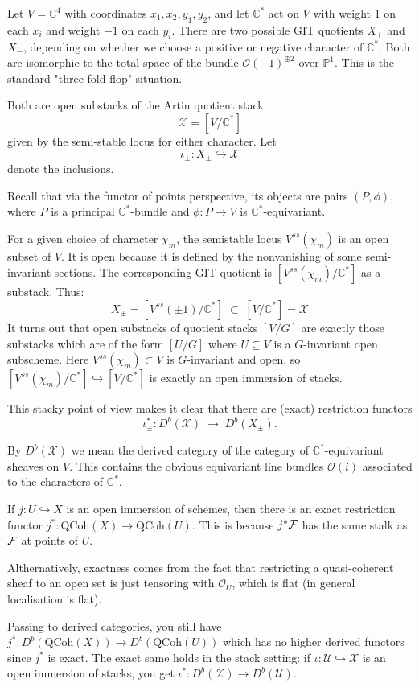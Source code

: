 \documentclass[12pt]{article}
\begin{document}
Let $V = \mathbb{C}^4$ with coordinates $x_1, x_2, y_1, y_2$, and let $\mathbb{C}^*$ act on $V$ with weight $1$ on each $x_i$ and weight $-1$ on each $y_i$. There are two possible GIT quotients $X_{+}$ and $X_{-}$, depending on whether we choose a positive or negative character of $\mathbb{C}^*$. Both are isomorphic to the total space of the bundle $\mathcal{O}(-1)^{\oplus 2}$ over $\mathbb{P}^1$. This is the standard "three-fold flop" situation.

Both are open substacks of the Artin quotient stack
\[
  \mathcal{X} = [V/\mathbb{C}^*]
\]
given by the semi-stable locus for either character.
Let
\[
  \iota_{\pm} : X_{\pm} \hookrightarrow \mathcal{X}
\]
denote the inclusions.

\begin{remark}
  Recall that via the functor of points perspective, its objects are pairs $(P,\phi)$, where $P$ is a principal $\mathbb{C}^*$-bundle and $\phi: P\to V$ is $\mathbb{C}^*$-equivariant.

  For a given choice of character $\chi_m$, the semistable locus $V^{ss}(\chi_m)$ is an open subset of $V$. It is open because it is defined by the nonvanishing of some semi-invariant sections. The corresponding GIT quotient is $[V^{ss}(\chi_m)/\mathbb{C}^*]$ as a substack.
  Thus:
  \[
    X_\pm = [V^{ss}(\pm 1)/\mathbb{C}^*] \;\subset\; [V/\mathbb{C}^*] = \mathcal{X}
  \]
  It turns out that open substacks of quotient stacks $[V/G]$ are exactly those substacks which are of the form $[U/G]$ where $U\subseteq V$ is a $G$-invariant open subscheme. Here $V^{ss}(\chi_m)\subset V$ is $G$-invariant and open, so $[V^{ss}(\chi_m)/\mathbb{C}^*]\hookrightarrow [V/\mathbb{C}^*]$ is exactly an open immersion of stacks.
\end{remark}

This stacky point of view makes it clear that there are (exact) restriction functors
\[
  \iota_{\pm}^* : D^b(\mathcal{X}) \;\to\; D^b(X_{\pm}).
\]

By $D^b(\mathcal{X})$ we mean the derived category of the category of $\mathbb{C}^*$-equivariant sheaves on $V$. This contains the obvious equivariant line bundles $\mathcal{O}(i)$ associated to the characters of $\mathbb{C}^*$.

\begin{remark}
  If $j: U \hookrightarrow X$ is an open immersion of schemes, then there is an exact restriction functor $j^*: \mathrm{QCoh}(X) \to \mathrm{QCoh}(U)$. This is because $j^*{\mathcal{F}}$ has the same stalk as ${\mathcal{F}}$ at points of $U$.

  Althernatively, exactness comes from the fact that restricting a quasi-coherent sheaf to an open set is just tensoring with $\mathcal{O}_U$, which is flat (in general localisation is flat).

  Passing to derived categories, you still have $j^*: D^b(\mathrm{QCoh}(X)) \to D^b(\mathrm{QCoh}(U))$ which has no higher derived functors since $j^*$ is exact. The exact same holds in the stack setting: if $\iota: \mathcal{U} \hookrightarrow \mathcal{X}$ is an open immersion of stacks, you get $\iota^*: D^b(\mathcal{X}) \to D^b(\mathcal{U})$.
\end{remark}
\end{document}
